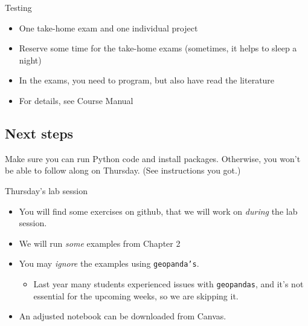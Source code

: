 \begin{frame}{Testing}
\begin{itemize}
	\item One take-home exam and one individual project
	\item Reserve some time for the take-home exams (sometimes, it helps to sleep a night)
	\item In the exams, you need to program, but also have read the literature
	\item For details, see Course Manual
\end{itemize}
\end{frame}


\subsection{Next steps}


\begin{frame}[standout]
	Make sure you can run Python code and install packages. Otherwise, you won't be able to follow along on Thursday. (See instructions you got.)
\end{frame}

\begin{frame}{Thursday's lab session}
	\begin{itemize}
		\item You will find some exercises on github, that we will work on \emph{during} the lab session. 
		\item We will run \emph{some} examples from Chapter 2
		\item You may \emph{ignore} the examples using \texttt{geopanda's}. 
		\begin{itemize}
			\item Last year many students experienced issues with \texttt{geopandas}, and it's not essential for the upcoming weeks, so we are skipping it.
			\end{itemize}
		\item An adjusted notebook can be downloaded from Canvas. 
	\end{itemize}
\end{frame}



\begin{frame}
	\printbibliography
\end{frame}




